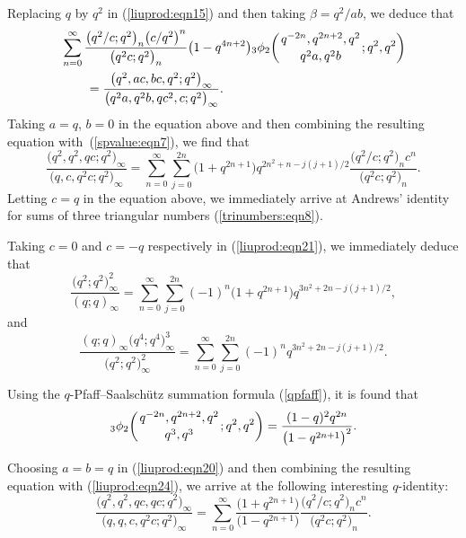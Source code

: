 \documentclass[pdftex]{sigma}
\numberwithin{equation}{section}
\begin{document}
Replacing $q$ by $q^2$ in (\ref{liuprod:eqn15}) and then taking $\beta=q^2/{ab}$, we deduce that
\begin{align}
	&\sum_{n=0}^\infty \frac{\bigl(q^2/c; q^2\bigr)_n \bigl(c/q^2\bigr)^n}{\bigl(q^2c; q^2\bigr)_n} \bigl(1-q^{4n+2}\bigr)
	{_3\phi_2} \biggl({{q^{-2n}, q^{2n+2}, q^2}\atop{q^2a, q^2b}}; q^2, q^2\biggr)\nonumber\\
	&\qquad{}=\frac{\bigl(q^2, ac, bc, q^2; q^2\bigr)_\infty}{\bigl(q^2a, q^2b, qc^2, c; q^2\bigr)_\infty}.\label{liuprod:eqn20}
\end{align}
Taking $a=q$, $b=0$ in the equation above and then combining the resulting equation with~(\ref{spvalue:eqn7}), we find that
\begin{equation}\label{liuprod:eqn21}
\frac{\bigl(q^2, q^2, qc; q^2\bigr)_\infty}{\bigl(q, c, q^2c; q^2\bigr)_\infty}=\sum_{n=0}^\infty \sum_{j=0}^{2n} \bigl(1+q^{2n+1}\bigr) q^{2n^2+n-j(j+1)/2}
\frac{\bigl(q^2/c; q^2\bigr)_n c^n}{\bigl(q^2c; q^2\bigr)_n}.
\end{equation}
Letting $c=q$ in the equation above, we immediately arrive at
Andrews' identity for sums of three triangular numbers (\ref{trinumbers:eqn8}).

Taking $c=0$ and $c=-q$ respectively in (\ref{liuprod:eqn21}), we immediately deduce that
\begin{equation*}%
\frac{\bigl(q^2; q^2\bigr)_\infty^2}{(q; q)_\infty}
=\sum_{n=0}^\infty \sum_{j=0}^{2n} (-1)^n \bigl(1+q^{2n+1}\bigr) q^{3n^2+2n-j(j+1)/2},
\end{equation*}
and
\begin{equation*}%
\frac{(q; q)_\infty \bigl(q^4; q^4\bigr)^3_\infty}{\bigl(q^2; q^2\bigr)^2_\infty}
=\sum_{n=0}^\infty \sum_{j=0}^{2n} (-1)^n q^{3n^2+2n-j(j+1)/2}.	
\end{equation*}

Using the $q$-Pfaff--Saalsch\"utz summation formula (\ref{qpfaff}), it is found that
\begin{equation}\label{liuprod:eqn24}
{_3\phi_2} \biggl({{q^{-2n}, q^{2n+2}, q^2}\atop{q^3, q^3}}; q^2, q^2\biggr)
=\frac{(1-q)^2 q^{2n}}{\bigl(1-q^{2n+1}\bigr)^2}.
\end{equation}

Choosing $a=b=q$ in (\ref{liuprod:eqn20}) and then combining the resulting equation with (\ref{liuprod:eqn24}), we arrive at the following interesting $q$-identity:
\begin{equation}\label{liuprod:eqn25}
\frac{\bigl(q^2, q^2, qc, qc; q^2\bigr)_\infty}{\bigl(q, q, c, q^2c; q^2\bigr)_\infty}
=\sum_{n=0}^\infty \frac{\bigl(1+q^{2n+1}\bigr)}{\bigl(1-q^{2n+1}\bigr)} \frac{\bigl(q^2/c; q^2\bigr)_n c^n}{\bigl(q^2c; q^2\bigr)_n}.
\end{equation}
\end{document}
